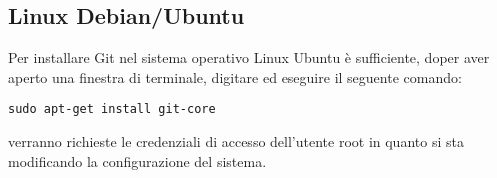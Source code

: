 \subsection{Linux Debian/Ubuntu}
Per installare Git nel sistema operativo Linux Ubuntu è sufficiente, doper aver aperto una finestra di terminale, digitare ed eseguire il seguente comando:

\begin{center}
\texttt{sudo apt-get install git-core}
\end{center}

verranno richieste le credenziali di accesso dell'utente root in quanto si sta modificando la configurazione del sistema.
